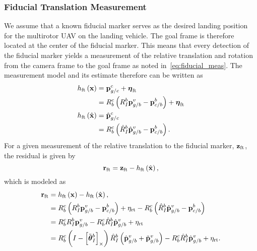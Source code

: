 \subsubsection{Fiducial Translation Measurement}
We assume that a known fiducial marker serves as the desired landing position
for the multirotor UAV on the landing vehicle. The goal frame is therefore
located at the center of the fiducial marker. This means that every detection of the fiducial
marker yields a measurement of the relative translation and rotation from the
camera frame to the goal frame as noted in~\eqref{eq:fiducial_meas}.
The measurement model and its estimate
therefore can be written as
\begin{align*}
  h_{\text{ft}} \left( \boldsymbol{\mathrm{x}} \right) &=
  \boldsymbol{\mathrm{p}}_{g/c}^c + \boldsymbol{\mathrm{\eta}}_{\text{ft}} \\
  &= R_b^c \left( R_I^b \boldsymbol{\mathrm{p}}_{g/b}^v -
  \boldsymbol{\mathrm{p}}_{c/b}^b \right) + \boldsymbol{\mathrm{\eta}}_{\text{ft}} \\
  h_{\text{ft}} \left( \hat{\boldsymbol{\mathrm{x}}} \right) &=
    \hat{\boldsymbol{\mathrm{p}}}_{g/c}^c \\
  &= R_b^c \left( \hat{R}_I^b \hat{\boldsymbol{\mathrm{p}}}_{g/b}^v -
    \boldsymbol{\mathrm{p}}_{c/b}^b \right). 
\end{align*}
For a given measurement of the relative translation to the fiducial marker,
$\boldsymbol{\mathrm{z}}_{\text{ft}}$, the residual is given by
\begin{equation*}
  \boldsymbol{\mathrm{r}}_{\text{ft}} = \boldsymbol{\mathrm{z}}_{\text{ft}} - h_{\text{ft}} \left( \hat{\boldsymbol{\mathrm{x}}}
  \right),
\end{equation*}
which is modeled as
\begin{align*}
  \boldsymbol{\mathrm{r}}_{\text{ft}} &=  h_{\text{ft}} \left( \boldsymbol{\mathrm{x}} \right) - h_{\text{ft}} \left( \hat{\boldsymbol{\mathrm{x}}}
  \right), \\
                       &= R_b^c \left( R_I^b \boldsymbol{\mathrm{p}}_{g/b}^v -
                         \boldsymbol{\mathrm{p}}_{c/b}^b \right)  +\eta_{\text{rt}} - R_b^c \left( \hat{R}_I^b \hat{\boldsymbol{\mathrm{p}}}_{g/b}^v -
    \boldsymbol{\mathrm{p}}_{c/b}^b \right)  \\
                       &= R_b^c R_I^b \boldsymbol{\mathrm{p}}_{g/b}^v 
                          - R_b^c \hat{R}_I^b \hat{\boldsymbol{\mathrm{p}}}_{g/b}^v +
                          \eta_{\text{rt}} \\
                       &= R_b^c \left( I - \left[ \tilde{\boldsymbol{\mathrm{\theta}}}_I^b  \right]_{\times}\right) \hat{R}_I^b \left( \hat{\boldsymbol{\mathrm{p}}}_{g/b}^v + \tilde{\boldsymbol{\mathrm{p}}}_{g/b}^v \right) 
                          - R_b^c \hat{R}_I^b \hat{\boldsymbol{\mathrm{p}}}_{g/b}^v +
                          \eta_{\text{rt}}.
\end{align*}
